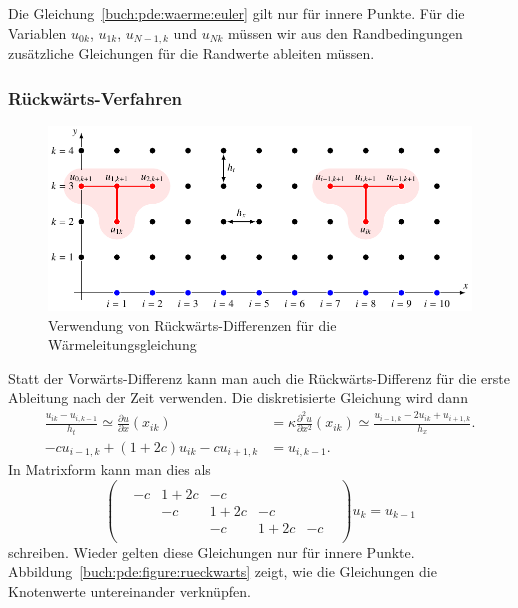 Die Gleichung~\eqref{buch:pde:waerme:euler} gilt nur für innere Punkte.
Für die Variablen $u_{0k}$, $u_{1k}$, $u_{N-1,k}$ und $u_{Nk}$ müssen
wir aus den Randbedingungen zusätzliche Gleichungen für die Randwerte
ableiten müssen.

\subsubsection{Rückwärts-Verfahren}
\begin{figure}
\centering
\includegraphics{chapters/70-pde/images/rueckwaerts.pdf}
\caption{Verwendung von Rückwärts-Differenzen für die Wärmeleitungsgleichung
\label{buch:pde:figure:rueckwaerts}}
\end{figure}
Statt der Vorwärts-Differenz kann man auch die Rückwärts-Differenz für
die erste Ableitung nach der Zeit verwenden.
Die diskretisierte Gleichung wird dann
\begin{align*}
\frac{u_{ik}-u_{i,k-1}}{h_t}
\simeq
\frac{\partial u}{\partial x}(x_{ik})
&=
\kappa\frac{\partial^2 u}{\partial x^2}(x_{ik})
\simeq
\frac{u_{i-1,k}-2u_{ik} + u_{i+1,k}}{h_x}.
\\
-cu_{i-1,k}
+
(1+2c)u_{ik}
-cu_{i+1,k}
&=u_{i,k-1}.
\end{align*}
In Matrixform kann man dies als
\[
\begin{pmatrix}
&  &    &    &    &    & \\
&-c&1+2c& -c &    &    & \\
&  & -c &1+2c& -c &    & \\
&  &    & -c &1+2c& -c & \\
&  &    &    &    &    & 
\end{pmatrix}
u_k
=
u_{k-1}
\]
schreiben.
Wieder gelten diese Gleichungen nur für innere Punkte.
Abbildung~\ref{buch:pde:figure:rueckwarts} zeigt, wie die Gleichungen
die Knotenwerte untereinander verknüpfen.

